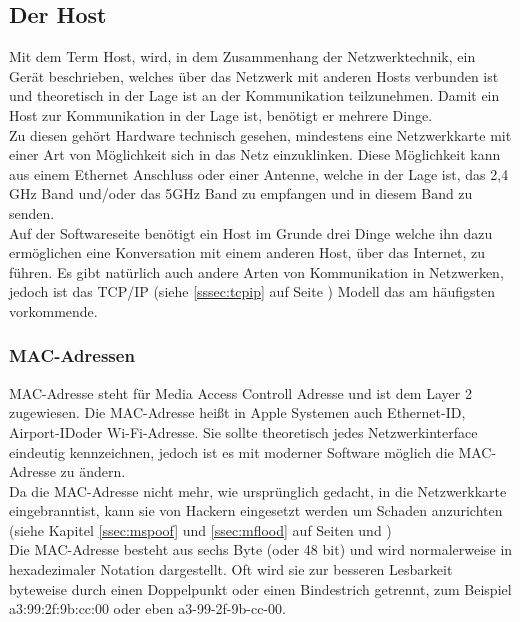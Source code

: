 \documentclass[11pt,a4paper]{report}
\begin{document}
\subsection{Der Host}
Mit dem Term \glqq Host\grqq , wird, in dem Zusammenhang der Netzwerktechnik, ein Gerät beschrieben, welches über das Netzwerk mit anderen Hosts verbunden ist und theoretisch in der Lage ist an der Kommunikation teilzunehmen. Damit ein Host zur Kommunikation in der Lage ist, benötigt er mehrere Dinge.\\
Zu diesen gehört Hardware technisch gesehen, mindestens eine Netzwerkkarte mit einer Art von Möglichkeit sich in das Netz einzuklinken. Diese Möglichkeit kann aus einem Ethernet Anschluss oder einer Antenne, welche in der Lage ist, das 2,4 GHz Band und/oder das 5GHz Band zu empfangen und in diesem Band zu senden.\\
Auf der Softwareseite benötigt ein Host im Grunde drei Dinge welche ihn dazu ermöglichen eine Konversation mit einem anderen Host, über das Internet, zu führen. Es gibt natürlich auch andere Arten von Kommunikation in Netzwerken, jedoch ist das TCP/IP (siehe \ref{sssec:tcpip} auf Seite \pageref{sssec:tcpip}) Modell das am häufigsten vorkommende. 

\subsubsection{MAC-Adressen}\label{sssec:macaddr}
MAC-Adresse steht für Media Access Controll Adresse und ist dem Layer 2 zugewiesen. Die MAC-Adresse heißt in Apple Systemen auch \glqq Ethernet-ID\grqq , \glqq Airport-ID\grqq oder \glqq Wi-Fi-Adresse\grqq . Sie sollte theoretisch jedes Netzwerkinterface eindeutig kennzeichnen, jedoch ist es mit moderner Software möglich die MAC-Adresse zu ändern.\\
Da die MAC-Adresse nicht mehr, wie ursprünglich gedacht, in die Netzwerkkarte \glqq eingebrannt\grqq ist, kann sie von Hackern eingesetzt werden um Schaden anzurichten (siehe Kapitel \ref{ssec:mspoof} und \ref{ssec:mflood} auf Seiten \pageref{ssec:mspoof} und \pageref{ssec:mflood})\\

Die MAC-Adresse besteht aus sechs Byte (oder 48 bit) und wird normalerweise in hexadezimaler Notation dargestellt. Oft wird sie zur besseren Lesbarkeit byteweise durch einen Doppelpunkt oder einen Bindestrich getrennt, zum Beispiel a3:99:2f:9b:cc:00 oder eben a3-99-2f-9b-cc-00.\\
\end{document}
